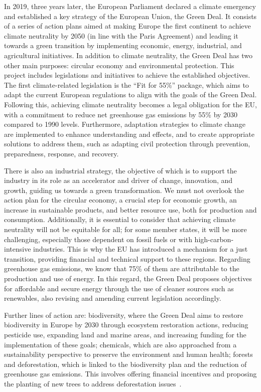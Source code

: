 In 2019, three years later, the European Parliament declared a climate emergency and established a key strategy of the European Union, the Green Deal. It consists of a series of action plans aimed at making Europe the first continent to achieve climate neutrality by 2050 (in line with the Paris Agreement) and leading it towards a green transition by implementing economic, energy, industrial, and agricultural initiatives. In addition to climate neutrality, the Green Deal has two other main purposes: circular economy and environmental protection. This project includes legislations and initiatives to achieve the established objectives. The first climate-related legislation is the “Fit for 55\%” package, which aims to adapt the current European regulations to align with the goals of the Green Deal. Following this, achieving climate neutrality becomes a legal obligation for the EU, with a commitment to reduce net greenhouse gas emissions by \num{55}\% by 2030 compared to 1990 levels. Furthermore, adaptation strategies to climate change are implemented to enhance understanding and effects, and to create appropriate solutions to address them, such as adapting civil protection through prevention, preparedness, response, and recovery.

There is also an industrial strategy, the objective of which is to support the industry in its role as an accelerator and driver of change, innovation, and growth, guiding us towards a green transformation. We must not overlook the action plan for the circular economy, a crucial step for economic growth, an increase in sustainable products, and better resource use, both for production and consumption. Additionally, it is essential to consider that achieving climate neutrality will not be equitable for all; for some member states, it will be more challenging, especially those dependent on fossil fuels or with high-carbon-intensive industries. This is why the EU has introduced a mechanism for a just transition, providing financial and technical support to these regions. Regarding greenhouse gas emissions, we know that \num{75}\% of them are attributable to the production and use of energy. In this regard, the Green Deal proposes objectives for affordable and secure energy through the use of cleaner sources such as renewables, also revising and amending current legislation accordingly.

Further lines of action are: biodiversity, where the Green Deal aims to restore biodiversity in Europe by 2030 through ecosystem restoration actions, reducing pesticide use, expanding land and marine areas, and increasing funding for the implementation of these goals; chemicals, which are also approached from a sustainability perspective to preserve the environment and human health; forests and deforestation, which is linked to the biodiversity plan and the reduction of greenhouse gas emissions. This involves offering financial incentives and proposing the planting of new trees to address deforestation issues~\parencite{green_deal}.

